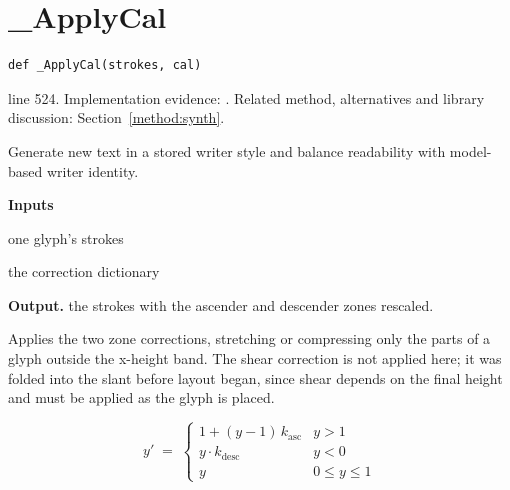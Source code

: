 \section{\_ApplyCal}\label{fn:synthesise:-ApplyCal}
\begin{lstlisting}[style=sig]
def _ApplyCal(strokes, cal)
\end{lstlisting}
 line 524. Implementation evidence: \cite{code2026}. Related method, alternatives and library discussion: Section~\ref{method:synth}.


Generate new text in a stored writer style and balance readability with model-based writer identity.




\noindent\textbf{Inputs}
\begin{description}[leftmargin=2.2em,style=nextline,font=\normalfont\ttfamily]\setlength\itemsep{1pt}
  \item[{strokes}] \normalfont one glyph's strokes
  \item[{cal}] \normalfont the correction dictionary
\end{description}

\noindent\textbf{Output.} the strokes with the ascender and descender zones rescaled.


Applies the two zone corrections, stretching or compressing only the parts of a glyph outside the x-height band. The shear correction is not applied here; it was folded into the slant before layout began, since shear depends on the final height and must be applied as the glyph is placed.


\begin{equation}
y' \;=\; \begin{cases} 1 + (y-1)\,k_{\mathrm{asc}} & y > 1 \\[3pt] y \cdot k_{\mathrm{desc}} & y < 0 \\[3pt] y & 0 \le y \le 1 \end{cases}
\end{equation}

